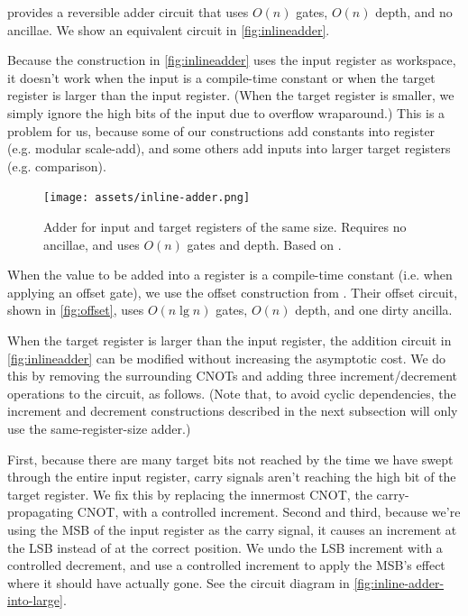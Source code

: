 \documentclass[twocolumn,longbibliography]{quantumarticle-customized}
\begin{document}
\cite{takahashi2005} provides a reversible adder circuit that uses $O(n)$ gates, $O(n)$ depth, and no ancillae.
We show an equivalent circuit in \autoref{fig:inlineadder}.

Because the construction in \autoref{fig:inlineadder} uses the input register as workspace, it doesn't work when the input is a compile-time constant or when the target register is larger than the input register.
(When the target register is smaller, we simply ignore the high bits of the input due to overflow wraparound.)
This is a problem for us, because some of our constructions add constants into register (e.g. modular scale-add), and some others add inputs into larger target registers (e.g. comparison).

\begin{figure}
  \centering
  \texttt{[image: assets/inline-adder.png]}
  \caption{ Adder for input and target registers of the same size.
  Requires no ancillae, and uses $O(n)$ gates and depth.
  Based on \cite{van2004, takahashi2005}.}
  \label{fig:inlineadder}
\end{figure}

When the value to be added into a register is a compile-time constant (i.e. when applying an offset gate), we use the offset construction from \cite{haner2016}.
Their offset circuit, shown in \autoref{fig:offset}, uses $O(n \lg n)$ gates, $O(n)$ depth, and one dirty ancilla.

When the target register is larger than the input register, the addition circuit in \autoref{fig:inlineadder} can be modified without increasing the asymptotic cost.
We do this by removing the surrounding CNOTs and adding three increment/decrement operations to the circuit, as follows.
(Note that, to avoid cyclic dependencies, the increment and decrement constructions described in the next subsection will only use the same-register-size adder.)

First, because there are many target bits not reached by the time we have swept through the entire input register, carry signals aren't reaching the high bit of the target register.
We fix this by replacing the innermost CNOT, the carry-propagating CNOT, with a controlled increment.
Second and third, because we're using the MSB of the input register as the carry signal, it causes an increment at the LSB instead of at the correct position.
We undo the LSB increment with a controlled decrement, and use a controlled increment to apply the MSB's effect where it should have actually gone.
See the circuit diagram in \autoref{fig:inline-adder-into-large}.
\end{document}
